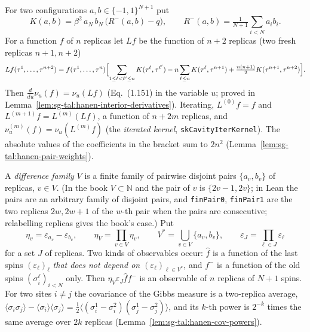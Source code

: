 \begin{definition}\label{def:sg-tal:hanen-kernel}
\leanok
{}
For two configurations $a,b\in\{-1,1\}^{N+1}$ put
\[
K(a,b)=\beta^2\,a_N\,b_N\,\bigl(R^-(a,b)-q\bigr),\qquad R^-(a,b)=\tfrac1{N+1}\sum_{i<N}a_ib_i .
\]
For a function $f$ of $n$ replicas let $Lf$ be the function of $n+2$ replicas (two fresh replicas $n+1,n+2$)
\[
Lf(\tau^1,\dots,\tau^{n+2})=f(\tau^1,\dots,\tau^n)\Bigl[\sum_{1\le\ell<\ell'\le n}K(\tau^\ell,\tau^{\ell'})
-n\sum_{\ell\le n}K(\tau^\ell,\tau^{n+1})+\tfrac{n(n+1)}2K(\tau^{n+1},\tau^{n+2})\Bigr].
\]
Then $\frac{d}{du}\nu_u(f)=\nu_u(Lf)$ (Eq.~(1.151) in the variable $u$; proved in
Lemma~\ref{lem:sg-tal:hanen-interior-derivatives}). Iterating, $L^{(0)}f=f$ and $L^{(m+1)}f=L^{(m)}(Lf)$, a function of
$n+2m$ replicas, and $\nu_u^{(m)}(f)=\nu_u(L^{(m)}f)$ (the \emph{iterated kernel}, \texttt{skCavityIterKernel}).
The absolute values of the coefficients in the bracket sum to $2n^2$
(Lemma~\ref{lem:sg-tal:hanen-pair-weights}).
\end{definition}

\begin{definition}\label{def:sg-tal:hanen-spin-differences}
\leanok
{}
A \emph{difference family} $V$ is a finite family of pairwise disjoint pairs $\{a_v,b_v\}$ of replicas, $v\in V$.
(In the book $V\subset\mathbb N$ and the pair of $v$ is $\{2v-1,2v\}$; in Lean the pairs are an arbitrary
family of disjoint pairs, and \texttt{finPair0}, \texttt{finPair1} are the two replicas $2w,2w+1$ of the $w$-th pair when the pairs are consecutive; relabelling replicas gives the book's case.) Put
\[
\eta_v=\varepsilon_{a_v}-\varepsilon_{b_v},\qquad \eta_V=\prod_{v\in V}\eta_v,\qquad
V^*=\bigcup_{v\in V}\{a_v,b_v\},\qquad \varepsilon_J=\prod_{\ell\in J}\varepsilon_\ell
\]
for a set $J$ of replicas. Two kinds of observables occur:
$\hat f$ is a function of the last spins $(\varepsilon_\ell)_\ell$ \emph{that does not depend on $(\varepsilon_\ell)_{\ell\in V^*}$}, and
$f^-$ is a function of the old spins $(\sigma^\ell_i)_{i<N}$ only. Then
$\eta_V\varepsilon_J\hat f f^-$ is an observable of $n$ replicas of $N+1$ spins.
For two sites $i\ne j$ the covariance of the Gibbs measure is a two-replica average,
$\langle\sigma_i\sigma_j\rangle-\langle\sigma_i\rangle\langle\sigma_j\rangle
=\tfrac12\langle(\sigma^1_i-\sigma^2_i)(\sigma^1_j-\sigma^2_j)\rangle$, and its $k$-th power is $2^{-k}$ times the same average over $2k$ replicas
(Lemma~\ref{lem:sg-tal:hanen-cov-powers}).
\end{definition}

